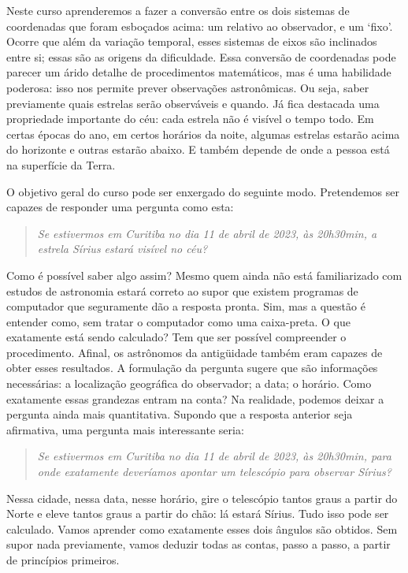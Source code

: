 Neste curso aprenderemos a fazer a conversão entre os dois sistemas de coordenadas que foram esboçados acima: um relativo ao observador, e um `fixo'. Ocorre que além da variação temporal, esses sistemas de eixos são inclinados entre si; essas são as origens da dificuldade. Essa conversão de coordenadas pode parecer um árido detalhe de procedimentos matemáticos, mas é uma habilidade poderosa: isso nos permite prever observações astronômicas. Ou seja, saber previamente quais estrelas serão observáveis e quando. Já fica destacada uma propriedade importante do céu: cada estrela não é visível o tempo todo. Em certas épocas do ano, em certos horários da noite, algumas estrelas estarão acima do horizonte e outras estarão abaixo. E também depende de onde a pessoa está na superfície da Terra.

O objetivo geral do curso pode ser enxergado do seguinte modo. Pretendemos ser capazes de responder uma pergunta como esta:
%
\begin{quote}
\itshape Se estivermos em Curitiba no dia 11 de abril de 2023, às 20h30min, a estrela Sírius estará visível no céu?
\end{quote}
%
Como é possível saber algo assim? Mesmo quem ainda não está familiarizado com estudos de astronomia estará correto ao supor que existem programas de computador que seguramente dão a resposta pronta. Sim, mas a questão é entender como, sem tratar o computador como uma caixa-preta. O que exatamente está sendo calculado? Tem que ser possível compreender o procedimento. Afinal, os astrônomos da antigüidade também eram capazes de obter esses resultados. A formulação da pergunta sugere que são informações necessárias: a localização geográfica do observador; a data; o horário. Como exatamente essas grandezas entram na conta? Na realidade, podemos deixar a pergunta ainda mais quantitativa. Supondo que a resposta anterior seja afirmativa, uma pergunta mais interessante seria:
%
\begin{quote}
\itshape Se estivermos em Curitiba no dia 11 de abril de 2023, às 20h30min, para onde exatamente deveríamos apontar um telescópio para observar Sírius?
\end{quote}
%
Nessa cidade, nessa data, nesse horário, gire o telescópio tantos graus a partir do Norte e eleve tantos graus a partir do chão: lá estará Sírius. Tudo isso pode ser calculado. Vamos aprender como exatamente esses dois ângulos são obtidos. Sem supor nada previamente, vamos deduzir todas as contas, passo a passo, a partir de princípios primeiros.

